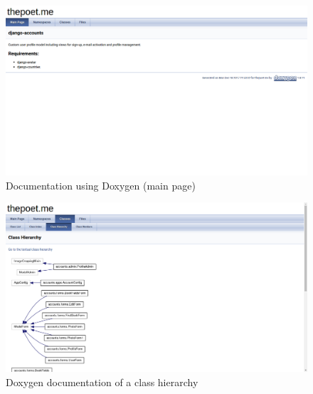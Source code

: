 \begin{figure}[H]
\centering \includegraphics[scale=.35]{images/thepoetdoxy.png}
\caption{Documentation using Doxygen (main page)}
\end{figure}


\begin{figure}[H]
\centering \includegraphics[scale=.35]{images/thepoetclass.png}
\caption{Doxygen documentation of a class hierarchy}
\end{figure}



